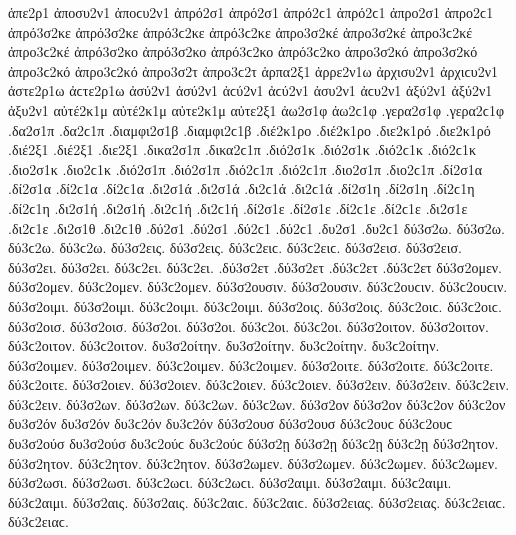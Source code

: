 {ἁπε2ρ1   %
ἀποσυ2ν1 ἀποϲυ2ν1   %
ἀπρό2σ1 ἀπρό2σ1 ἀπρό2ϲ1 ἀπρό2ϲ1   %
ἀπρο2σ1 ἀπρο2ϲ1 
ἀπρό3σ2κε ἀπρό3σ2κε ἀπρό3ϲ2κε ἀπρό3ϲ2κε   %
ἀπρο3σ2κέ ἀπρο3σ2κέ ἀπρο3ϲ2κέ ἀπρο3ϲ2κέ 
ἀπρό3σ2κο ἀπρό3σ2κο ἀπρό3ϲ2κο ἀπρό3ϲ2κο   %
ἀπρο3σ2κό ἀπρο3σ2κό ἀπρο3ϲ2κό ἀπρο3ϲ2κό 
ἀπρο3σ2τ ἀπρο3ϲ2τ   %
ἁρπα2ξ1   %
ἀρρε2ν1ω   %
ἀρχισυ2ν1 ἀρχιϲυ2ν1   %
ἀστε2ρ1ω ἀϲτε2ρ1ω   %
ἀσύ2ν1 ἀσύ2ν1 ἀϲύ2ν1 ἀϲύ2ν1   %
ἀσυ2ν1 ἀϲυ2ν1 
ἀξύ2ν1 ἀξύ2ν1   %
ἀξυ2ν1 
αὐτέ2κ1μ αὐτέ2κ1μ   %
αὐτε2κ1μ 
αὐτε2ξ1   %
ἀω2σ1φ ἀω2ϲ1φ   %
.γερα2σ1φ .γερα2ϲ1φ   %
.δα2σ1π .δα2ϲ1π   %
.διαμφι2σ1β .διαμφι2ϲ1β   %
.διέ2κ1ρο .διέ2κ1ρο   %
.διε2κ1ρό .διε2κ1ρό 
.διέ2ξ1 .διέ2ξ1   %
.διε2ξ1   %
.δικα2σ1π .δικα2ϲ1π   %
.διό2σ1κ .διό2σ1κ .διό2ϲ1κ .διό2ϲ1κ   %
.διο2σ1κ .διο2ϲ1κ 
.διό2σ1π .διό2σ1π .διό2ϲ1π .διό2ϲ1π   %
.διο2σ1π .διο2ϲ1π 
.δί2σ1α .δί2σ1α .δί2ϲ1α .δί2ϲ1α   %
.δι2σ1ά .δι2σ1ά .δι2ϲ1ά .δι2ϲ1ά 
.δί2σ1η .δί2σ1η .δί2ϲ1η .δί2ϲ1η   %
.δι2σ1ή .δι2σ1ή .δι2ϲ1ή .δι2ϲ1ή 
.δί2σ1ε .δί2σ1ε .δί2ϲ1ε .δί2ϲ1ε   %
.δι2σ1ε .δι2ϲ1ε 
.δι2σ1θ .δι2ϲ1θ   %
.δύ2σ1 .δύ2σ1 .δύ2ϲ1 .δύ2ϲ1   %
.δυ2σ1 .δυ2ϲ1 
%
δύ3σ2ω. δύ3σ2ω. δύ3ϲ2ω. δύ3ϲ2ω.   %
δύ3σ2εις. δύ3σ2εις. δύ3ϲ2ειϲ. δύ3ϲ2ειϲ. 
δύ3σ2εισ. δύ3σ2εισ. 
δύ3σ2ει. δύ3σ2ει. δύ3ϲ2ει. δύ3ϲ2ει. 
.δύ3σ2ετ .δύ3σ2ετ .δύ3ϲ2ετ .δύ3ϲ2ετ 
δύ3σ2ομεν. δύ3σ2ομεν. δύ3ϲ2ομεν. δύ3ϲ2ομεν. 
δύ3σ2ουσιν. δύ3σ2ουσιν. δύ3ϲ2ουϲιν. δύ3ϲ2ουϲιν. 
δύ3σ2οιμι. δύ3σ2οιμι. δύ3ϲ2οιμι. δύ3ϲ2οιμι. 
δύ3σ2οις. δύ3σ2οις. δύ3ϲ2οιϲ. δύ3ϲ2οιϲ. 
δύ3σ2οισ. δύ3σ2οισ. 
δύ3σ2οι. δύ3σ2οι. δύ3ϲ2οι. δύ3ϲ2οι. 
δύ3σ2οιτον. δύ3σ2οιτον. δύ3ϲ2οιτον. δύ3ϲ2οιτον. 
δυ3σ2οίτην. δυ3σ2οίτην. δυ3ϲ2οίτην. δυ3ϲ2οίτην. 
δύ3σ2οιμεν. δύ3σ2οιμεν. δύ3ϲ2οιμεν. δύ3ϲ2οιμεν. 
δύ3σ2οιτε. δύ3σ2οιτε. δύ3ϲ2οιτε. δύ3ϲ2οιτε. 
δύ3σ2οιεν. δύ3σ2οιεν. δύ3ϲ2οιεν. δύ3ϲ2οιεν. 
δύ3σ2ειν. δύ3σ2ειν. δύ3ϲ2ειν. δύ3ϲ2ειν. 
δύ3σ2ων. δύ3σ2ων. δύ3ϲ2ων. δύ3ϲ2ων. δύ3σ2ον δύ3σ2ον δύ3ϲ2ον δύ3ϲ2ον δυ3σ2όν δυ3σ2όν δυ3ϲ2όν δυ3ϲ2όν 
δύ3σ2ουσ δύ3σ2ουσ δύ3ϲ2ουϲ δύ3ϲ2ουϲ δυ3σ2ούσ δυ3σ2ούσ δυ3ϲ2ούϲ δυ3ϲ2ούϲ 
δύ3σ2ῃ δύ3σ2ῃ δύ3ϲ2ῃ δύ3ϲ2ῃ 
δύ3σ2ητον. δύ3σ2ητον. δύ3ϲ2ητον. δύ3ϲ2ητον. 
δύ3σ2ωμεν. δύ3σ2ωμεν. δύ3ϲ2ωμεν. δύ3ϲ2ωμεν. 
δύ3σ2ωσι. δύ3σ2ωσι. δύ3ϲ2ωϲι. δύ3ϲ2ωϲι. 
δύ3σ2αιμι. δύ3σ2αιμι. δύ3ϲ2αιμι. δύ3ϲ2αιμι. 
δύ3σ2αις. δύ3σ2αις. δύ3ϲ2αιϲ. δύ3ϲ2αιϲ. δύ3σ2ειας. δύ3σ2ειας. δύ3ϲ2ειαϲ. δύ3ϲ2ειαϲ. 
}
